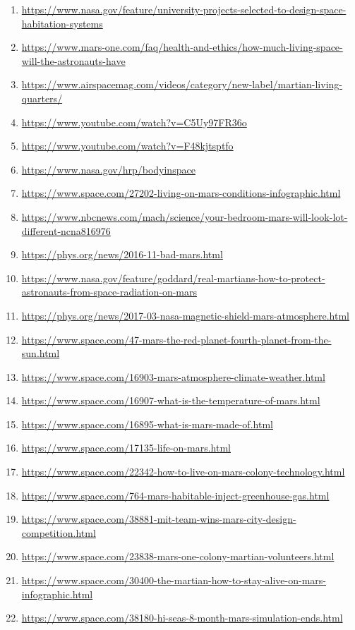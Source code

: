 \documentclass{article}
\begin{document}
\begin{enumerate}
  \item \url{https://www.nasa.gov/feature/university-projects-selected-to-design-space-habitation-systems}
  \item \url{https://www.mars-one.com/faq/health-and-ethics/how-much-living-space-will-the-astronauts-have}
  \item \url{https://www.airspacemag.com/videos/category/new-label/martian-living-quarters/}
  \item \url{https://www.youtube.com/watch?v=C5Uy97FR36o}
  \item \url{https://www.youtube.com/watch?v=F48kjtsptfo}
  \item \url{https://www.nasa.gov/hrp/bodyinspace}
  \item \url{https://www.space.com/27202-living-on-mars-conditions-infographic.html}
  \item \url{https://www.nbcnews.com/mach/science/your-bedroom-mars-will-look-lot-different-ncna816976}
  \item \url{https://phys.org/news/2016-11-bad-mars.html}
  \item \url{https://www.nasa.gov/feature/goddard/real-martians-how-to-protect-astronauts-from-space-radiation-on-mars}
  \item \url{https://phys.org/news/2017-03-nasa-magnetic-shield-mars-atmosphere.html}
  \item \url{https://www.space.com/47-mars-the-red-planet-fourth-planet-from-the-sun.html}
  \item \url{https://www.space.com/16903-mars-atmosphere-climate-weather.html}
  \item \url{https://www.space.com/16907-what-is-the-temperature-of-mars.html}
  \item \url{https://www.space.com/16895-what-is-mars-made-of.html}
  \item \url{https://www.space.com/17135-life-on-mars.html}
  \item \url{https://www.space.com/22342-how-to-live-on-mars-colony-technology.html}
  \item \url{https://www.space.com/764-mars-habitable-inject-greenhouse-gas.html}
  \item \url{https://www.space.com/38881-mit-team-wins-mars-city-design-competition.html}
  \item \url{https://www.space.com/23838-mars-one-colony-martian-volunteers.html}
  \item \url{https://www.space.com/30400-the-martian-how-to-stay-alive-on-mars-infographic.html}
  \item \url{https://www.space.com/38180-hi-seas-8-month-mars-simulation-ends.html}

\end{enumerate}
\end{document}
